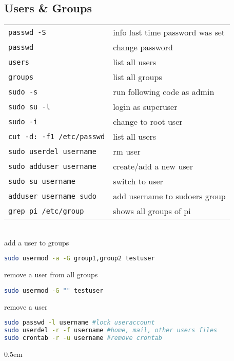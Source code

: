 \documentclass[fontsize=6pt,paper=a4,paper=landscape,twoside=false,parskip=half,
headings=small,numbers=withenddot,usegeometry=true,english]{scrartcl}
\providecommand{\sectionbox}[1]{{\fboxsep0.5em\hspace*{-1.5\fboxsep}%
 \fcolorbox{gray}{gray!3}{%
 \parbox{\columnwidth}{%
 \raggedright #1}}}}
\begin{document}
\begin{multicols}{4}
{	\subsection{Users \& Groups}\label{sec:usersgroupss}
	\begin{tabular}{@{}ll@{}}\toprule
		\texttt{passwd -S}  &  info last time password was set\\
		\texttt{passwd}  &  change password\\
		\texttt{users}  &  list all users\\
		\texttt{groups}  &  list all groups\\
		\texttt{sudo -s}  &  run following code as admin\\
		\texttt{sudo su -l}  &  login as superuser\\
		\texttt{sudo -i}  &  change to root user\\
		\texttt{cut -d: -f1 /etc/passwd}  &  list all users\\
		\texttt{sudo userdel username}  &  rm  user\\
		\texttt{sudo adduser username}  &  create/add a new user\\
		\texttt{sudo su username}  &  switch to user\\
		\texttt{adduser username sudo}  &  add username to sudoers group\\
		\texttt{grep pi /etc/group}  &  shows all groups of pi\\
		\bottomrule
	\end{tabular}\\
		add a user to groups\\
	\begin{lstlisting}[language=bash]
sudo usermod -a -G group1,group2 testuser
	\end{lstlisting}

		remove a user from all groups\\
	\begin{lstlisting}[language=bash]
sudo usermod -G "" testuser
	\end{lstlisting}

		remove a user\\
	\begin{lstlisting}[language=bash]
sudo passwd -l username #lock useraccount
sudo userdel -r -f username #home, mail, other users files
sudo crontab -r -u username #remove crontab
	\end{lstlisting}
}

\sectionbox{
}
\end{multicols}
\end{document}
